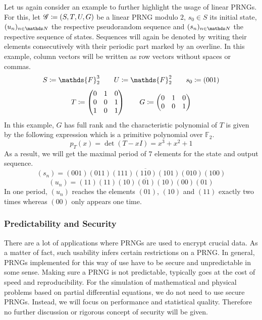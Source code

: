 \documentclass{stdlocal}
\begin{document}
  \noindent
  Let us again consider an example to further highlight the usage of linear PRNGs.
  For this, let $\mathscr{G}\coloneqq (S,T,U,G)$ be a linear PRNG modulo $2$, $s_0\in S$ its initial state, $(u_n)_{n\in\setNatural}$ the respective pseudorandom sequence and $(s_n)_{n\in\setNatural}$ the respective sequence of states.
  Sequences will again be denoted by writing their elements consecutively with their periodic part marked by an overline.
  In this example, column vectors will be written as row vectors without spaces or commas.
  \[
    S \define \mathds{F}_2^3
    \separate
    U \define \mathds{F}_2^2
    \separate
    s_0 \define (001)
  \]
  \[
    T \coloneqq
    \begin{pmatrix}
      0 & 1 & 0 \\
      0 & 0 & 1 \\
      1 & 0 & 1
    \end{pmatrix}
    \qquad
    G \coloneqq
    \begin{pmatrix}
      0 & 1 & 0 \\
      0 & 0 & 1
    \end{pmatrix}
  \]
  In this example, $G$ has full rank and the characteristic polynomial of $T$ is given by the following expression which is a primitive polynomial over $\mathds{F}_2$.
  \[
    p_T(x) = \det(T - xI) = x^3 + x^2 + 1
  \]
  As a result, we will get the maximal period of $7$ elements for the state and output sequence.
  \[
    (s_n) = \overline{(001)(011)(111)(110)(101)(010)(100)}
  \]
  \[
    (u_n) = \overline{(11)(11)(10)(01)(10)(00)(01)}
  \]
  In one period, $(u_n)$ reaches the elements $(01)$, $(10)$ and $(11)$ exactly two times whereas $(00)$ only appears one time.


  \subsubsection*{Predictability and Security}
  There are a lot of applications where PRNGs are used to encrypt crucial data.
  As a matter of fact, such usability infers certain restrictions on a PRNG.
  In general, PRNGs implemented for this way of use have to be secure and unpredictable in some sense.
  Making sure a PRNG is not predictable, typically goes at the cost of speed and reproducibility.
  For the simulation of mathematical and physical problems based on partial differential equations, we do not need to use secure PRNGs.
  Instead, we will focus on performance and statistical quality.
  Therefore no further discussion or rigorous concept of security will be given.
\end{document}

